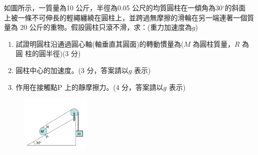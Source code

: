 \documentclass[cn,10pt,math=newtx]{elegantbook}
\begin{document}
\begin{example}
   如圖所示，一質量為10 公斤，半徑為0.05 公尺的均質圓柱在一傾角為30$^\circ$的斜面
上被一條不可伸長的輕繩纏繞在圓柱上，並跨過無摩擦的滑輪在另一端連著一個質量為
20 公斤的重物。假設圓柱只滾不滑，求：(重力加速度為$g$)

\begin{enumerate}[label=(\arabic*)] 
  \item 試證明圓柱沿通過圓心軸(軸垂直其圓面)的轉動慣量為($M$ 為圓柱質量，$R$ 為圓
柱的圓半徑)(3 分)
  \item 圓柱中心的加速度。(3 分，答案請以$g$ 表示)
  \item 作用在接觸點P 上的靜摩擦力。(4 分，答案請以$g$ 表示)
    \end{enumerate}
    \rightline{[台中女中教甄109]}
\end{example}
\begin{solution}
    
\end{solution}
\begin{figure}[htbp]
    \flushright
    \includegraphics[width=0.3\textwidth]{image/109中女22.png}
  \end{figure}
\newpage
\end{document}
